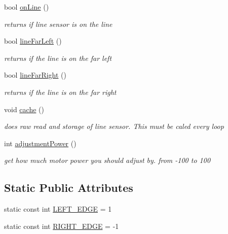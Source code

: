 \begin{DoxyCompactItemize}
bool \hyperlink{classLineSensor_ad9d3c5a694f1ff946d1137df1694b026}{on\-Line} ()
\begin{DoxyCompactList}\small\item\em returns if line sensor is on the line \end{DoxyCompactList}\item 
bool \hyperlink{classLineSensor_a245ec54d83927caedf553d82e6381b6f}{line\-Far\-Left} ()
\begin{DoxyCompactList}\small\item\em returns if the line is on the far left \end{DoxyCompactList}\item 
bool \hyperlink{classLineSensor_ac21e1169d0b4689c13b63ffb44e416c3}{line\-Far\-Right} ()
\begin{DoxyCompactList}\small\item\em returns if the line is on the far right \end{DoxyCompactList}\item 
void \hyperlink{classLineSensor_afc809d2aa49426d949f76f68b0154050}{cache} ()
\begin{DoxyCompactList}\small\item\em does raw read and storage of line sensor. This must be caled every loop \end{DoxyCompactList}\item 
int \hyperlink{classLineSensor_a74c3c2d7a454aeacae90501670d01bdc}{adjustment\-Power} ()
\begin{DoxyCompactList}\small\item\em get how much motor power you should adjust by. from -\/100 to 100 \end{DoxyCompactList}\end{DoxyCompactItemize}
\subsection*{Static Public Attributes}
\begin{DoxyCompactItemize}
\item 
static const int \hyperlink{classLineSensor_ab9ac72fc63ec896d4b140171c5576a1a}{L\-E\-F\-T\-\_\-\-E\-D\-G\-E} = 1
\item 
static const int \hyperlink{classLineSensor_a729c00cce10a00a9cb6fcfc9c6904290}{R\-I\-G\-H\-T\-\_\-\-E\-D\-G\-E} = -\/1
\end{DoxyCompactItemize}
